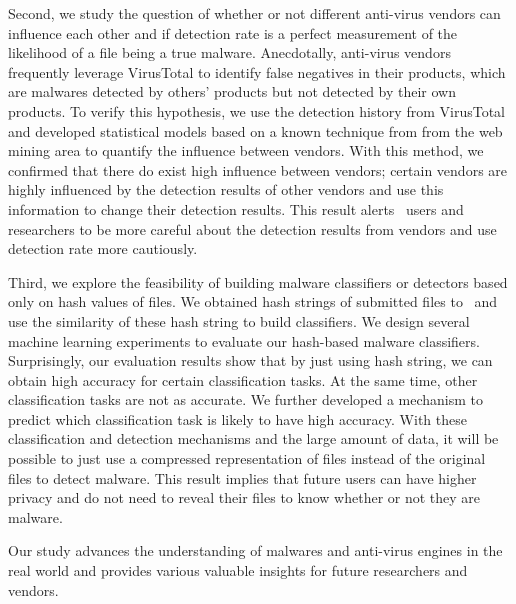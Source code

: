 Second, we study the question of whether or not different anti-virus vendors can influence each other
and if detection rate is a perfect measurement of the likelihood of a file being a true malware.
Anecdotally, anti-virus vendors frequently leverage VirusTotal to identify false negatives in their products, 
which are malwares detected by others’ products but not detected by their own products. 
To verify this hypothesis, we use the detection history from VirusTotal 
and developed statistical models based on a known technique from from the web mining area to quantify the influence between vendors. 
With this method, we confirmed that there do exist high influence between vendors;
certain vendors are highly influenced by the detection results of other vendors and use this information to change their detection results.
This result alerts \vt\ users and researchers to be more careful about the detection results from vendors 
and use detection rate more cautiously.

Third, we explore the feasibility of building malware classifiers or detectors based only on hash values of files.
We obtained hash strings of submitted files to \vt\ 
and use the similarity of these hash string to build classifiers.
We design several machine learning experiments to evaluate our hash-based malware classifiers. 
Surprisingly, our evaluation results show that by just using hash string, 
we can obtain high accuracy for certain classification tasks.
At the same time, other classification tasks are not as accurate.
We further developed a mechanism to predict which classification task is likely to have high accuracy.
With these classification and detection mechanisms and the large amount of data,
it will be possible to just use a compressed representation of files instead of the original files 
to detect malware.
This result implies that future users can have higher privacy and do not need to reveal their files to know whether or not they are malware.

Our study advances the understanding of malwares and anti-virus engines in the real world 
and provides various valuable insights for future researchers and vendors.

